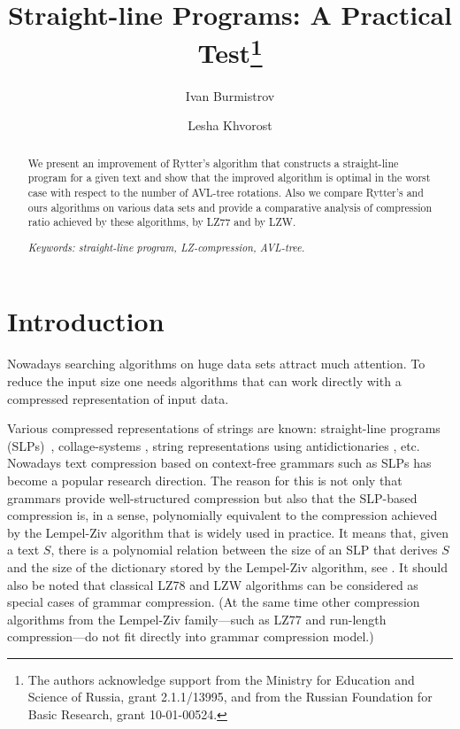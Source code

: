 \documentclass[10pt]{article}
\begin{document}
\title{Straight-line Programs: A Practical Test\thanks{The authors acknowledge support
from the Ministry for Education and Science of Russia, grant 2.1.1/13995, and
from the Russian Foundation for Basic Research, grant 10-01-00524.}}
\author{Ivan Burmistrov \and Lesha Khvorost}
\date{}

\maketitle

\begin{abstract}
We present an improvement of Rytter's algorithm that constructs a straight-line program for a given text and show that
the improved algorithm is optimal in the worst case with respect to the number of  AVL-tree rotations. Also we compare
Rytter's and ours  algorithms on various data sets and provide a comparative analysis of compression ratio achieved by
these algorithms, by LZ77 and by LZW.

\noindent \emph{Keywords: straight-line program, LZ-compression, AVL-tree.}
\end{abstract}

\section{Introduction}

Nowadays searching algorithms on huge data sets attract much attention. To reduce the input size one needs algorithms
that can work directly with a compressed representation of input data.

Various compressed representations of strings are known: straight-line programs (SLPs)~\cite{SLPConstruction}, 
collage-systems \cite{collages}, string representations using antidictionaries \cite{antidictionaries}, etc.  Nowadays
text compression based on context-free grammars such as SLPs has become a popular research direction. The reason for 
this is not only that grammars provide well-structured compression but also that the SLP-based compression is, in a 
sense, polynomially equivalent to the compression achieved by the Lempel-Ziv algorithm that is widely used in practice. 
It means that, given a text $S$, there is a polynomial relation between the size of an SLP that derives $S$ and the size
of the dictionary stored by the Lempel-Ziv algorithm, see \cite{SLPConstruction}. It should also be noted that classical
LZ78 \cite{LZ78} and LZW \cite{LZW} algorithms can be considered as special cases of grammar compression. (At the same 
time other compression algorithms from the Lempel-Ziv family---such as LZ77 \cite{LZ77} and run-length compression---do 
not fit directly into grammar compression model.)
\end{document}
